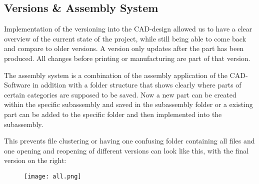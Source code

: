\documentclass[../report.tex]{subfiles}
\begin{document}
\maketitle

\subsection{Versions \& Assembly System}
Implementation of  the versioning into the CAD-design allowed us to have a clear overview
of the current state of the project, while still being able to come back and compare to older 
versions. 
A version only updates after the part has been produced. All changes before 
printing or manufacturing are part of that version.

The assembly system is a combination of the assembly application of the CAD-Software
in addition with a folder structure that shows clearly where parts of certain categories 
are supposed to be saved. Now a new part can be created within the specific subassembly and 
saved in the subassembly folder or a existing part can be added to the specific folder and 
then implemented into the subassembly. 

This prevents file clustering or having one confusing folder containing all files and one opening 
and reopening of different versions can look like this, with the final version on the right:
\begin{figure}[H]
    \texttt{[image: all.png]}
\end{figure}
\end{document}
